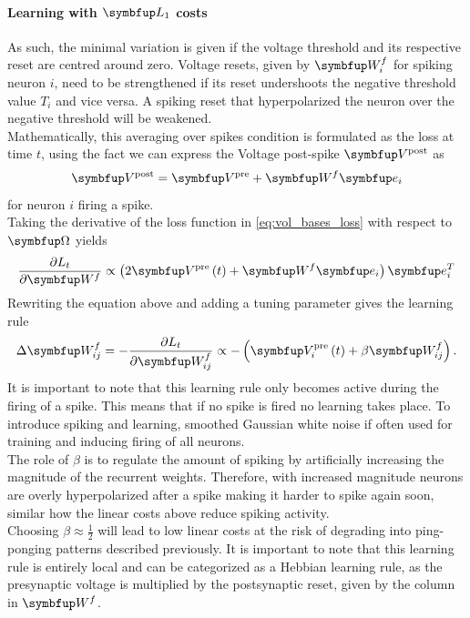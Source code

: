 \paragraph{Learning with $\bmu{L_1}$ costs}
As such, the minimal variation is given if the voltage threshold and its respective reset are centred around zero. Voltage resets, given by $\bmu{W}^f_i$ for spiking neuron $i$, need to be strengthened if its reset undershoots the negative threshold value $T_i$ and vice versa. A spiking reset that hyperpolarized the neuron over the negative threshold will be weakened.\\
Mathematically, this averaging over spikes condition is formulated as the loss at time $t$, using the fact we can express the Voltage post-spike $\bmu{V}^{\text {post}}$ as
\begin{equation}
	\bmu{V}^{\text {post}} = \bmu{V}^{\text {pre}} + \bmu{W}^f \bmu{e}_i
\end{equation}
for neuron $i$ firing a spike.\\
Taking the derivative of the loss function in \cref{eq:vol_bases_loss} with respect to $\bmu{\Omega}$ yields
\begin{equation}
\frac{\partial L_t}{\partial \bmu{W}^f} \propto\left(2 \bmu{V}^{\text {pre}}\left(t\right)+\bmu{W}^f \bmu{e}_{i}\right) \bmu{e}_{i}^{T}
\end{equation}
Rewriting the equation above and adding a tuning parameter gives the learning rule
\begin{equation}\label{eq:Wf_learning_rule_1}
	\Delta \bmu{W}^f_{ij} =-\frac{\partial L_t}{\partial \bmu{W}^f_{ij}} \propto - \left( \bmu{V}_i^{\text {pre}}\left(t\right)+\beta \bmu{W}^f_{ij}\right).
\end{equation}
It is important to note that this learning rule only becomes active during the firing of a spike. This means that if no spike is fired no learning takes place. To introduce spiking and learning, smoothed  Gaussian white noise if often used for training and inducing firing of all neurons.\\
The role of $\beta$ is to regulate the amount of spiking by artificially increasing the magnitude of the recurrent weights. Therefore, with increased magnitude neurons are overly hyperpolarized after a spike making it harder to spike again soon, similar how the linear costs above reduce spiking activity.\\
Choosing $\beta \approx \frac{1}{2}$ will lead to low linear costs at the risk of degrading into ping-ponging patterns described previously. It is important to note that this learning rule is entirely local and can be categorized as a Hebbian learning rule, as the presynaptic voltage is multiplied by the postsynaptic reset, given by the column in $\bmu{W}^f$.\\
